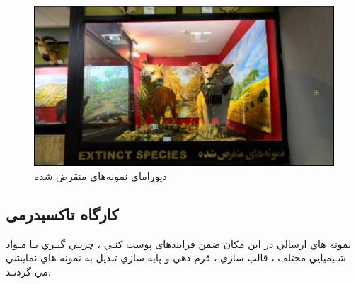 \begin{figure}
    \label{fig2.2}
    \centering
    \includegraphics[scale = 0.45]{images/monqarez.jpg}
    \caption{دیورامای نمونه‌‌های منقرض شده}
\end{figure}

\subsection{کارگاه تاکسیدرمی}
نمونه هاي ارسالي در اين مكان ضمن فرايندهای پوست كنـي ، چربـي گيـري بـا مـواد شـيميايي
مختلف ، قالب سازي ، فرم دهي و پايه سازي تبديل به نمونه هاي نمايشي مي گردنـد.